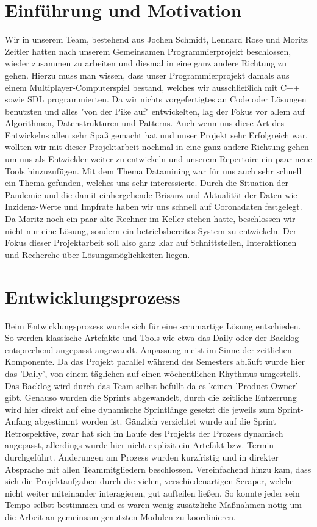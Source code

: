 \documentclass[12pt,oneside,a4paper,parskip]{scrbook}
\begin{document}
\chapter{Einführung und Motivation}\label{ch:intro}
Wir in unserem Team, bestehend aus Jochen Schmidt, Lennard Rose und Moritz Zeitler hatten nach unserem Gemeinsamen Programmierprojekt beschlossen, wieder zusammen zu arbeiten und diesmal in eine ganz andere Richtung zu gehen. Hierzu muss man wissen, dass unser Programmierprojekt damals aus einem Multiplayer-Computerspiel bestand, welches wir ausschließlich mit C++ sowie SDL programmierten. Da wir nichts vorgefertigtes an Code oder Lösungen benutzten und alles "von der Pike auf"  entwickelten, lag der Fokus vor allem auf Algorithmen, Datenstrukturen und Patterns. Auch wenn uns diese Art des Entwickelns allen sehr Spaß gemacht hat und unser Projekt sehr Erfolgreich war, wollten wir mit dieser Projektarbeit nochmal in eine ganz andere Richtung gehen um uns als Entwickler weiter zu entwickeln und unserem Repertoire ein paar neue Tools hinzuzufügen. Mit dem Thema Datamining war für uns auch sehr schnell ein Thema gefunden, welches uns sehr interessierte. Durch die Situation der Pandemie und die damit einhergehende Brisanz und Aktualität der Daten wie Inzidenz-Werte und Impfrate haben wir uns schnell auf Coronadaten festgelegt. Da Moritz noch ein paar alte Rechner im Keller stehen hatte, beschlossen wir nicht nur eine Lösung, sondern ein betriebsbereites System zu entwickeln. \newline
Der Fokus dieser Projektarbeit soll also ganz klar auf Schnittstellen, Interaktionen und Recherche über Lösungsmöglichkeiten liegen.

\chapter{Entwicklungsprozess}
Beim Entwicklungsprozess wurde sich f\"ur eine scrumartige L\"osung entschieden. So werden klassische Artefakte und Tools wie etwa das Daily oder der Backlog entsprechend angepasst angewandt. Anpassung meist im Sinne der zeitlichen Komponente. Da das Projekt parallel w\"ahrend des Semesters abl\"auft wurde hier das 'Daily', von einem t\"aglichen auf einen w\"ochentlichen Rhythmus umgestellt. Das Backlog wird durch das Team selbst bef\"ullt da es keinen 'Product Owner' gibt. Genauso wurden die Sprints abgewandelt, durch die zeitliche Entzerrung wird hier direkt auf eine dynamische Sprintl\"ange gesetzt die jeweils zum Sprint-Anfang abgestimmt worden ist. \newline
G\"anzlich verzichtet wurde auf die Sprint Retrospektive, zwar hat sich im Laufe des Projekts der Prozess dynamisch angepasst, allerdings wurde hier nicht explizit ein Artefakt bzw. Termin durchgef\"uhrt. \"Anderungen am Prozess wurden kurzfristig und in direkter Absprache mit allen Teammitgliedern beschlossen. Vereinfachend hinzu kam, dass sich die Projektaufgaben durch die vielen, verschiedenartigen Scraper, welche nicht weiter miteinander interagieren, gut aufteilen ließen. So konnte jeder sein Tempo selbst bestimmen und es waren wenig zusätzliche Maßnahmen nötig um die Arbeit an gemeinsam genutzten Modulen zu koordinieren.
\end{document}
